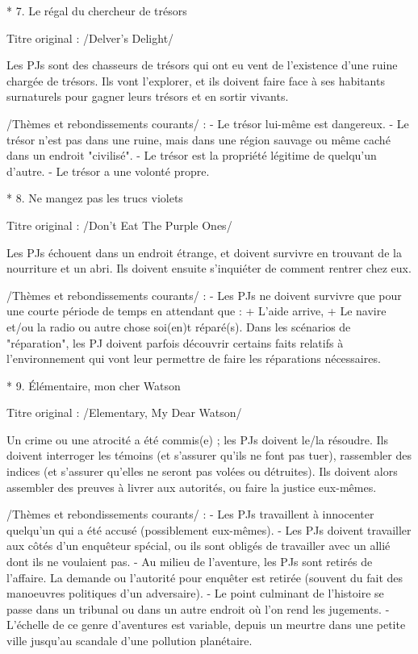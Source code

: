 \begin{enumerate}
* 7. Le régal du chercheur de trésors

Titre original : /Delver's Delight/ 

Les PJs sont des chasseurs de trésors qui ont eu vent de l'existence d'une ruine chargée de trésors. Ils vont l'explorer, et ils doivent faire face à ses habitants surnaturels pour gagner leurs trésors et en sortir vivants.

/Thèmes et rebondissements courants/ :
- Le trésor lui-même est dangereux.
- Le trésor n'est pas dans une ruine, mais dans une région sauvage ou même caché dans un endroit "civilisé".
- Le trésor est la propriété légitime de quelqu'un d'autre.
- Le trésor a une volonté propre.

* 8. Ne mangez pas les trucs violets

Titre original : /Don't Eat The Purple Ones/ 

Les PJs échouent dans un endroit étrange, et doivent survivre en trouvant de la nourriture et un abri. Ils doivent ensuite s'inquiéter de comment rentrer chez eux.

/Thèmes et rebondissements courants/ :
- Les PJs ne doivent survivre que pour une courte période de temps en attendant que :
  + L'aide arrive,
  + Le navire et/ou la radio ou autre chose soi(en)t réparé(s). Dans les scénarios de "réparation", les PJ doivent parfois découvrir certains faits relatifs à l'environnement qui vont leur permettre de faire les réparations nécessaires.

* 9. Élémentaire, mon cher Watson

Titre original : /Elementary, My Dear Watson/

Un crime ou une atrocité a été commis(e) ; les PJs doivent le/la résoudre. Ils doivent interroger les témoins (et s'assurer qu'ils ne font pas tuer), rassembler des indices (et s'assurer qu'elles ne seront pas volées ou détruites). Ils doivent alors assembler des preuves à livrer aux autorités, ou faire la justice eux-mêmes.

/Thèmes et rebondissements courants/ :
- Les PJs travaillent à innocenter quelqu'un qui a été accusé (possiblement eux-mêmes).
- Les PJs doivent travailler aux côtés d'un enquêteur spécial, ou ils sont obligés de travailler avec un allié dont ils ne voulaient pas.
- Au milieu de l'aventure, les PJs sont retirés de l'affaire. La demande ou l'autorité pour enquêter est retirée (souvent du fait des manoeuvres politiques d'un adversaire).
- Le point culminant de l'histoire se passe dans un tribunal ou dans un autre endroit où l'on rend les jugements.
- L'échelle de ce genre d'aventures est variable, depuis un meurtre dans une petite ville jusqu'au scandale d'une pollution planétaire.


\end{enumerate}

